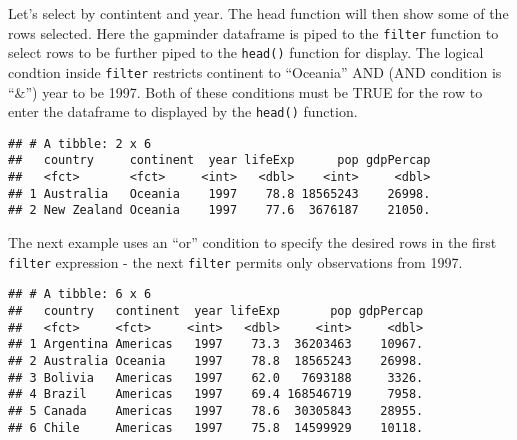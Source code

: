 \documentclass[]{book}
\newenvironment{Shaded}{\begin{snugshade}}{\end{snugshade}}
\newcommand{\KeywordTok}[1]{\textcolor[rgb]{0.13,0.29,0.53}{\textbf{#1}}}
\newcommand{\DecValTok}[1]{\textcolor[rgb]{0.00,0.00,0.81}{#1}}
\newcommand{\StringTok}[1]{\textcolor[rgb]{0.31,0.60,0.02}{#1}}
\newcommand{\OperatorTok}[1]{\textcolor[rgb]{0.81,0.36,0.00}{\textbf{#1}}}
\newcommand{\NormalTok}[1]{#1}
\begin{document}
Let's select by contintent and year. The head function will then show
some of the rows selected. Here the gapminder dataframe is piped to the
\texttt{filter} function to select rows to be further piped to the
\texttt{head()} function for display. The logical condtion inside
\texttt{filter} restricts continent to ``Oceania'' AND (AND condition is
``\&'') year to be 1997. Both of these conditions must be TRUE for the
row to enter the dataframe to displayed by the \texttt{head()} function.

\begin{Shaded}
\end{Shaded}

\begin{verbatim}
## # A tibble: 2 x 6
##   country     continent  year lifeExp      pop gdpPercap
##   <fct>       <fct>     <int>   <dbl>    <int>     <dbl>
## 1 Australia   Oceania    1997    78.8 18565243    26998.
## 2 New Zealand Oceania    1997    77.6  3676187    21050.
\end{verbatim}

The next example uses an ``or'' condition to specify the desired rows in
the first \texttt{filter} expression - the next \texttt{filter} permits
only observations from 1997.

\begin{Shaded}
\end{Shaded}

\begin{verbatim}
## # A tibble: 6 x 6
##   country   continent  year lifeExp       pop gdpPercap
##   <fct>     <fct>     <int>   <dbl>     <int>     <dbl>
## 1 Argentina Americas   1997    73.3  36203463    10967.
## 2 Australia Oceania    1997    78.8  18565243    26998.
## 3 Bolivia   Americas   1997    62.0   7693188     3326.
## 4 Brazil    Americas   1997    69.4 168546719     7958.
## 5 Canada    Americas   1997    78.6  30305843    28955.
## 6 Chile     Americas   1997    75.8  14599929    10118.
\end{verbatim}
\end{document}
